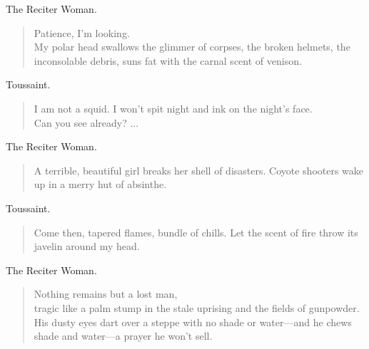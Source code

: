 \documentclass[letterpaper,article,12pt,oneside,notitlepage]{memoir}
\begin{document}
\begin{center}The Reciter Woman.\end{center}

\begin{verse}
\hspace{1cm} Patience, I'm looking. \\
My polar head swallows the glimmer of corpses, the broken helmets, the inconsolable debris, suns fat with the carnal scent of venison. \\
\end{verse}

\begin{center}Toussaint.\end{center}

\begin{verse}
\indent I am not a squid. I won't spit night and ink on the night's face. \\
Can you see already? ... \\
\end{verse}

\begin{center}The Reciter Woman.\end{center}

\begin{verse}
\indent A terrible, beautiful girl breaks her shell of disasters. Coyote shooters wake up in a merry hut of absinthe. \\
\end{verse}

\begin{center}Toussaint.\end{center}

\begin{verse}
Come then, tapered flames, bundle of chills. Let the scent of fire throw its javelin around my head. \\
\end{verse}


\begin{center}The Reciter Woman.\end{center}

\begin{verse}
\hspace{1cm} Nothing remains but a lost man, \\
tragic like a palm stump in the stale uprising and the fields of gunpowder. His dusty eyes dart over a steppe with no shade or water---and he chews shade and water---a prayer he won't sell. \\
\end{verse}
\end{document}
